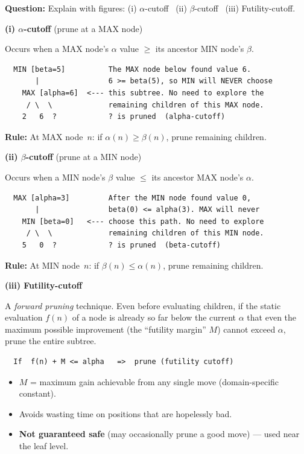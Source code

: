 \documentclass[12pt, a4paper]{article}
\newenvironment{answerbox}{\begin{mdframed}[style=answerframe]}{\end{mdframed}}
\begin{document}
\textbf{Question:} Explain with figures: (i) $\alpha$-cutoff \ (ii) $\beta$-cutoff \ (iii) Futility-cutoff.

\begin{answerbox}

\textbf{(i) $\alpha$-cutoff} (prune at a MAX node)

Occurs when a MAX node's $\alpha$ value $\geq$ its ancestor MIN node's $\beta$.

\begin{verbatim}
  MIN [beta=5]          The MAX node below found value 6.
       |                6 >= beta(5), so MIN will NEVER choose
    MAX [alpha=6]  <--- this subtree. No need to explore the
     / \  \             remaining children of this MAX node.
    2   6  ?            ? is pruned  (alpha-cutoff)
\end{verbatim}
\textbf{Rule:} At MAX node~$n$: if $\alpha(n) \geq \beta(n)$, prune remaining children.

\vspace{6pt}
\textbf{(ii) $\beta$-cutoff} (prune at a MIN node)

Occurs when a MIN node's $\beta$ value $\leq$ its ancestor MAX node's $\alpha$.

\begin{verbatim}
  MAX [alpha=3]         After the MIN node found value 0,
       |                beta(0) <= alpha(3). MAX will never
    MIN [beta=0]   <--- choose this path. No need to explore
     / \  \             remaining children of this MIN node.
    5   0  ?            ? is pruned  (beta-cutoff)
\end{verbatim}
\textbf{Rule:} At MIN node~$n$: if $\beta(n) \leq \alpha(n)$, prune remaining children.

\vspace{6pt}
\textbf{(iii) Futility-cutoff}

A \textit{forward pruning} technique. Even before evaluating children, if the static evaluation $f(n)$ of a node is already so far below the current $\alpha$ that even the maximum possible improvement (the ``futility margin'' $M$) cannot exceed $\alpha$, prune the entire subtree.

\begin{verbatim}
  If  f(n) + M <= alpha   =>  prune (futility cutoff)
\end{verbatim}

\begin{itemize}[noitemsep]
  \item $M$ = maximum gain achievable from any single move (domain-specific constant).
  \item Avoids wasting time on positions that are hopelessly bad.
  \item \textbf{Not guaranteed safe} (may occasionally prune a good move) --- used near the leaf level.
\end{itemize}
\end{answerbox}
\end{document}
